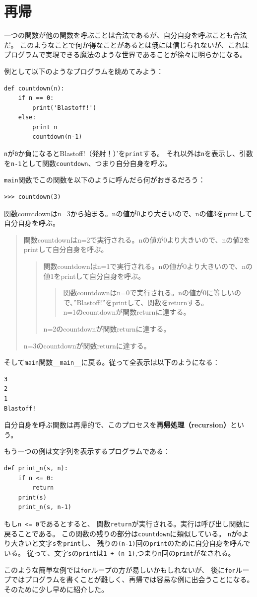 \documentclass[a4j,12pt,makeidx]{jbook}
\begin{document}
\section{再帰\label{recursion}}
一つの関数が他の関数を呼ぶことは合法であるが、自分自身を呼ぶことも合法だ。
このようなことで何か得なことがあるとは俄には信じられないが、これはプログラムで実現できる魔法のような世界であることが徐々に明らかになる。 \par
例として以下のようなプログラムを眺めてみよう：
\begin{verbatim}
def countdown(n):
    if n == 0:
        print('Blastoff!')
    else:
        print n
        countdown(n-1)
\end{verbatim}       
{\tt n}が{\tt 0}か負になるとBlastoff!（発射！）'を{\tt print}する。
それ以外は{\tt n}を表示し、引数を{\tt n-1}として関数{\tt countdown}、つまり自分自身を呼ぶ。\par
{\tt main}関数でこの関数を以下のように呼んだら何がおきるだろう：
\begin{verbatim}
>>> countdown(3)
\end{verbatim}
関数countdownはn=3から始まる。nの値が0より大きいので、nの値3をprintして自分自身を呼ぶ。
\begin{quote}
関数countdownはn=2で実行される。nの値が0より大きいので、nの値2をprintして自分自身を呼ぶ。
\begin{quote}
関数countdownはn=1で実行される。nの値が0より大きいので、nの値1をprintして自分自身を呼ぶ。
\begin{quote}
関数countdownはn=0で実行される。nの値が0に等しいので、”Blastoff!”をprintして、関数をreturnする。\\
n=1のcountdownが関数returnに達する。
\end{quote}
n=2のcountdownが関数returnに達する。
\end{quote}
n=3のcountdownが関数returnに達する。
\end{quote}
%
そして{\tt main}関数{\verb"__main__"}に戻る。従って全表示は以下のようになる：
\begin{verbatim}
3
2
1
Blastoff!
\end{verbatim}
自分自身を呼ぶ関数は再帰的で、このプロセスを{\bf 再帰処理（recursion）}という。 \par
もう一つの例は文字列を表示するプログラムである：
\begin{verbatim}
def print_n(s, n):
    if n <= 0:
        return
    print(s)
    print_n(s, n-1)
\end{verbatim}
もし{\tt n <= 0}であるとすると、
関数{\tt return}が実行される。実行は呼び出し関数に戻ることである。
この関数の残りの部分は{\tt countdown}に類似している。
{\tt n}が{\tt 0}より大きいと文字{\tt s}を{\tt print}し、
残りの{\tt (n-1)}回の{\tt print}のために自分自身を呼んでいる。
従って、文字{\tt s}の{\tt print}は{\tt 1 + (n-1)},つまり{\tt n}回の{\tt print}がなされる。 \par
このような簡単な例では{\tt for}ループの方が易しいかもしれないが、
後に{\tt for}ループではプログラムを書くことが難しく、再帰では容易な例に出会うことになる。
そのために少し早めに紹介した。
%
\end{document}
